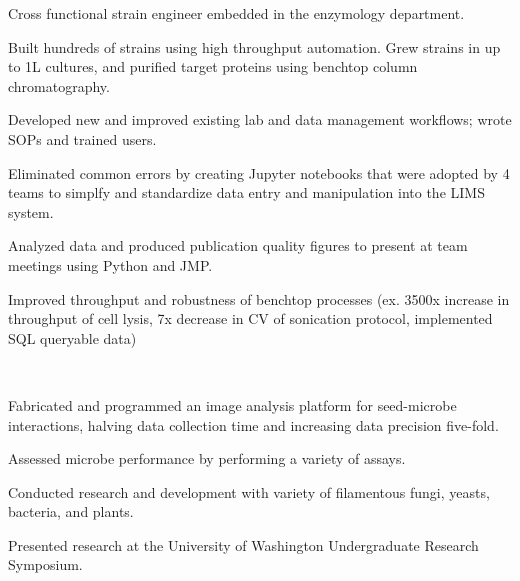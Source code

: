 \documentclass[]{forrest-resume-interfont}
\begin{document}
\begin{tightemize}
    \item Cross functional strain engineer embedded in the enzymology department.
    \item Built hundreds of strains using high throughput automation. Grew strains in up to 1L cultures, and purified target proteins using benchtop column chromatography.
    \item Developed new and improved existing lab and data management workflows; wrote SOPs and trained users. 
    \item Eliminated common errors by creating Jupyter notebooks that were adopted by 4 teams to simplfy and standardize data entry and manipulation into the LIMS system.
    \item Analyzed data and produced publication quality figures to present at team meetings using Python and JMP.
    \item Improved throughput and robustness of benchtop processes (ex. 3500x increase in throughput of cell lysis, 7x decrease in CV of sonication protocol, implemented SQL queryable data)
\end{tightemize}

\spacesep

\\

\begin{tightemize}
    \item Fabricated and programmed an image analysis platform for seed-microbe interactions, halving data collection time and increasing data precision five-fold.
    \item Assessed microbe performance by performing a variety of assays.
    \item Conducted research and development with variety of filamentous fungi, yeasts, bacteria, and plants.
    \item Presented research at the University of Washington Undergraduate Research Symposium.
\end{tightemize}

\spacesep

\\
\end{document}
